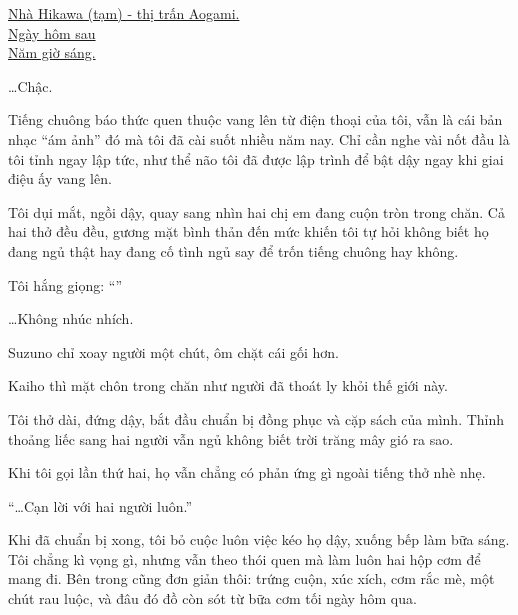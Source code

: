 \documentclass[../main.tex]{subfiles}
\begin{document}

\begin{center}
  \uline{Nhà Hikawa (tạm) - thị trấn Aogami.\\Ngày hôm sau\\Năm giờ sáng.}
\end{center}

\dots Chậc.

Tiếng chuông báo thức quen thuộc vang lên từ điện thoại của tôi, vẫn là cái bản nhạc ``ám ảnh'' đó mà tôi đã cài suốt nhiều năm nay. Chỉ cần nghe vài nốt đầu là tôi tỉnh ngay lập tức, như thể não tôi đã được lập trình để bật dậy ngay khi giai điệu ấy vang lên.

Tôi dụi mắt, ngồi dậy, quay sang nhìn hai chị em đang cuộn tròn trong chăn. Cả hai thở đều đều, gương mặt bình thản đến mức khiến tôi tự hỏi không biết họ đang ngủ thật hay đang cố tình ngủ say để trốn tiếng chuông hay không.

Tôi hắng giọng: ``''

\dots Không nhúc nhích.

Suzuno chỉ xoay người một chút, ôm chặt cái gối hơn.

Kaiho thì mặt chôn trong chăn như người đã thoát ly khỏi thế giới này.

Tôi thở dài, đứng dậy, bắt đầu chuẩn bị đồng phục và cặp sách của mình. Thỉnh thoảng liếc sang hai người vẫn ngủ không biết trời trăng mây gió ra sao.

Khi tôi gọi lần thứ hai, họ vẫn chẳng có phản ứng gì ngoài tiếng thở nhè nhẹ.

``\dots Cạn lời với hai người luôn.''

Khi đã chuẩn bị xong, tôi bỏ cuộc luôn việc kéo họ dậy, xuống bếp làm bữa sáng. Tôi chẳng kì vọng gì, nhưng vẫn theo thói quen mà làm luôn hai hộp cơm để mang đi. Bên trong cũng đơn giản thôi: trứng cuộn, xúc xích, cơm rắc mè, một chút rau luộc, và đâu đó đồ còn sót từ bữa cơm tối ngày hôm qua.
\end{document}
